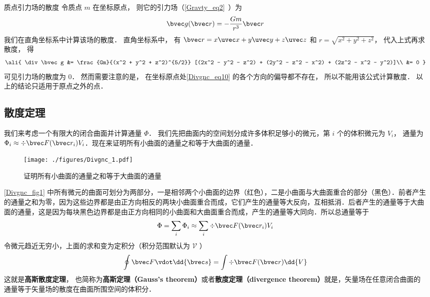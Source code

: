\begin{example}{质点引力场的散度}
令质点 $m$ 在坐标原点， 则它的引力场（\autoref{Gravty_eq2}~）为
\begin{equation}\label{Divgnc_eq10}
\bvec g(\bvec r) = -\frac{Gm}{r^3}\bvec r
\end{equation}
我们在直角坐标系中计算该场的散度． 直角坐标系中， 有 $\bvec r = x\uvec x + y\uvec y + z\uvec z$ 和 $r = \sqrt{x^2 + y^2 + z^2}$， 代入上式再求散度， 得
\begin{equation}\ali{
\div \bvec g &= \frac{Gm}{(x^2 + y^2 + z^2)^{5/2}} [(2x^2 - y^2 - z^2) + (2y^2 - z^2 - x^2) + (2z^2 - x^2 - y^2)]\\
&= 0
}\end{equation}
可见引力场的散度为 0． 然而需要注意的是， 在坐标原点处\autoref{Divgnc_eq10} 的各个方向的偏导都不存在， 所以不能用该公式计算散度． 以上的结论只适用于原点之外的点．
\end{example}


\subsection{散度定理}

我们来考虑一个有限大的闭合曲面并计算通量 $\Phi$． 我们先把曲面内的空间划分成许多体积足够小的微元，第 $i$ 个的体积微元为 $V_i$， 通量为 $\Phi_i \approx \div \bvec F(\bvec r_i) V_i$．现在来证明所有小曲面的通量之和等于大曲面的通量．
\begin{figure}[ht]
\centering
\texttt{[image: ./figures/Divgnc\_1.pdf]}
\caption{证明所有小曲面的通量之和等于大曲面的通量} \label{Divgnc_fig1}
\end{figure}
\autoref{Divgnc_fig1} 中所有微元的曲面可划分为两部分，一是相邻两个小曲面的边界（红色），二是小曲面与大曲面重合的部分（黑色）．前者产生的通量之和为零，因为这些边界都是由正方向相反的两块小曲面重合而成，它们产生的通量等大反向，互相抵消．后者产生的通量等于大曲面的通量，这是因为每块黑色边界都是由正方向相同的小曲面和大曲面重合而成，产生的通量等大同向．所以总通量等于
\begin{equation}
\Phi  = \sum_i \Phi_i  \approx \sum_i \div \bvec F (\bvec r_i) V_i
\end{equation}
令微元趋近无穷小，上面的求和变为定积分（积分范围默认为 $\mathcal V$ ）
\begin{equation}\label{Divgnc_eq13}
\oint \bvec F \vdot \dd{\bvec s} = \int \div \bvec F(\bvec r) \dd{V}
\end{equation}
这就是\textbf{高斯散度定理}， 也简称为\textbf{高斯定理（Gauss's theorem）}或者\textbf{散度定理（divergence theorem）}就是，矢量场在任意闭合曲面的通量等于矢量场的散度在曲面所围空间的体积分．

